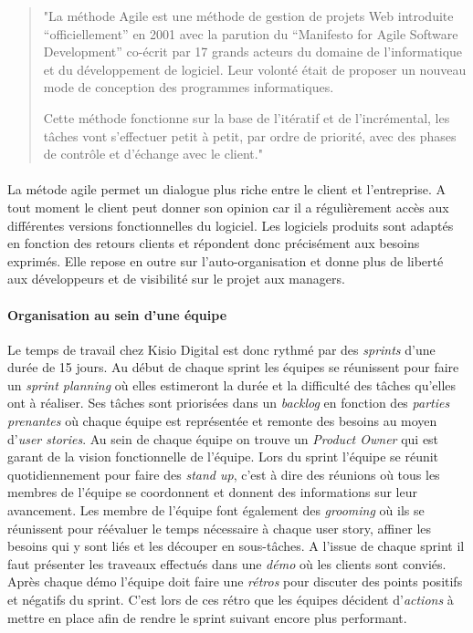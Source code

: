 \documentclass[a4paper]{report}
\begin{document}
\begin{quote}
"La méthode Agile est une méthode de gestion de projets Web introduite “officiellement” en 2001 avec la parution du “Manifesto for Agile Software Development” co-écrit par 17 grands acteurs du domaine de l’informatique et du développement de logiciel. Leur volonté était de proposer un nouveau mode de conception des programmes informatiques.

Cette méthode fonctionne sur la base de l'itératif et de l’incrémental, les tâches vont s’effectuer petit à petit, par ordre de priorité, avec des  phases de contrôle et d’échange avec le client."\cite{ref_agile}
\end{quote}

\paragraph{} La métode agile permet un dialogue plus riche entre le client et l'entreprise. A tout moment le client peut donner son opinion car il a régulièrement accès aux différentes versions fonctionnelles du logiciel. Les logiciels produits sont adaptés en fonction des retours clients et répondent donc précisément aux besoins exprimés. Elle repose en outre sur l'auto-organisation et donne plus de liberté aux développeurs et de visibilité sur le projet aux managers.


\paragraph {Organisation au sein d'une équipe} Le temps de travail chez Kisio Digital est donc rythmé par des \emph{sprints} d'une durée de 15 jours. Au début de chaque sprint les équipes se réunissent pour faire un \emph{sprint planning} où elles estimeront la durée et la difficulté des tâches qu'elles ont à réaliser. Ses tâches sont priorisées dans un \emph{backlog} en fonction des \emph{parties prenantes} où chaque équipe est représentée et remonte des besoins au moyen d'\emph{user stories}. Au sein de chaque équipe on trouve un \emph{Product Owner} qui est garant de la vision fonctionnelle de l'équipe. Lors du sprint l'équipe se réunit quotidiennement pour faire des \emph{stand up}, c'est à dire des réunions où tous les membres de l'équipe se coordonnent et donnent des informations sur leur avancement. Les membre de l'équipe font également des \emph{grooming} où ils se réunissent pour réévaluer le temps nécessaire à chaque user story, affiner les besoins qui y sont liés et les découper en sous-tâches. A l'issue de chaque sprint il faut présenter les traveaux effectués dans une \emph{démo} où les clients sont conviés. Après chaque démo l'équipe doit faire une \emph{rétros} pour discuter des points positifs et négatifs du sprint. C'est lors de ces rétro que les équipes décident d'\emph{actions} à mettre en place afin de rendre le sprint suivant encore plus performant.
\end{document}
